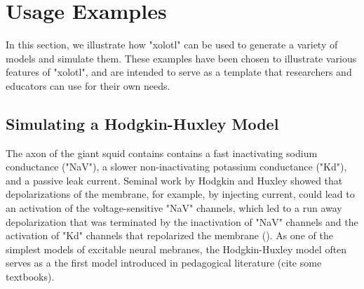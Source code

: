 \documentclass{frontiersSCNS} %
\begin{document}
%
%
%
%
%
%

\section{Usage Examples}
\label{usage}

In this section, we illustrate how "xolotl" can be used to generate a variety of models and simulate them. These examples have been chosen to illustrate various features of "xolotl", and are intended to serve as a template that researchers and educators can use for their own needs. 

%
%
%
%
%
%

\subsection{Simulating a Hodgkin-Huxley Model}

The axon of the giant squid contains contains a fast inactivating sodium conductance ("NaV"), a slower non-inactivating potassium conductance ("Kd"), and a passive leak current. Seminal work by Hodgkin and Huxley showed that depolarizations of the membrane, for example, by injecting current, could lead to an activation of the voltage-sensitive "NaV" channels, which led to a run away depolarization that was terminated by the inactivation of "NaV" channels and the activation of "Kd" channels that repolarized the membrane (\cite{hodgkinComponentsMembraneConductance1952, hodgkinMeasurementCurrentvoltageRelations1952}). As one of the simplest models of excitable neural mebranes, the Hodgkin-Huxley model often serves as a the first model introduced in pedagogical literature (cite some textbooks).  
\end{document}
